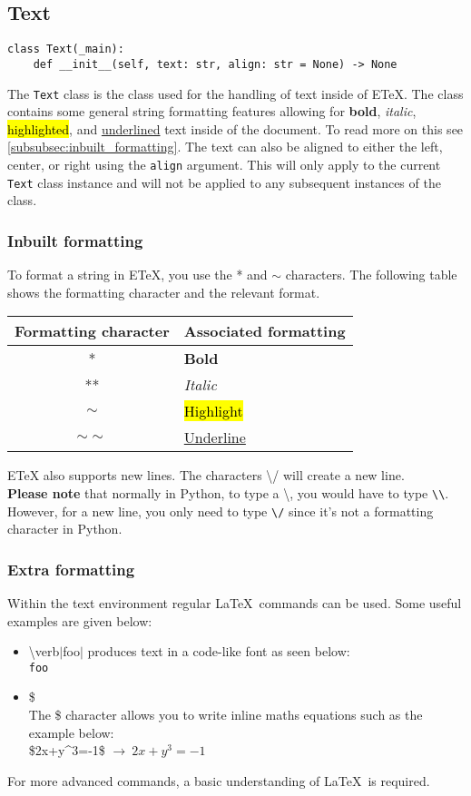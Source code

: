 \documentclass{article}
\begin{document}
\subsection{Text}\label{subsec:text}
\begin{verbatim}
class Text(_main):
	def __init__(self, text: str, align: str = None) -> None
\end{verbatim}
The \verb|Text| class is the class used for the handling of text inside of ETeX. The class contains some general string formatting features allowing for \textbf{bold}, \textit{italic}, \hl{highlighted}, and \underline{underlined} text inside of the document. To read more on this see \autoref{subsubsec:inbuilt_formatting}. The text can also be aligned to either the left, center, or right using the \verb|align| argument. This will only apply to the current \verb|Text| class instance and will not be applied to any subsequent instances of the class.
\subsubsection{Inbuilt formatting}\label{subsubsec:inbuilt_formatting}
To format a string in ETeX, you use the * and $\sim$ characters. The following table shows the formatting character and the relevant format.\\

\begin{center}
\begin{tabular}{| c | l |}
\hline
Formatting character & Associated formatting \\ \hline
* & \textbf{Bold} \\
** & \textit{Italic} \\
$\sim$ & \hl{Highlight} \\
$\sim\sim$ & \underline{Underline} \\
\hline
\end{tabular}
\end{center}
ETeX also supports new lines. The characters \textbackslash/ will create a new line.\\
 \textbf{Please note} that normally in Python, to type a \textbackslash, you would have to type \verb|\\|. However, for a new line, you only need to type \verb|\|\verb|/| since it's not a formatting character in Python.
\subsubsection{Extra formatting}\label{subsubsec:extra_formatting}
Within the text environment regular \LaTeX\ commands can be used. Some useful examples are given below:\begin{itemize}
\item {\textbackslash}verb$\mid${foo}$\mid$ produces text in a code-like font as seen below:\\
\verb|foo|
\item \$\\The \$ character allows you to write inline maths equations such as the example below:\\
\$2x+y\^{}3=-1\$ $\rightarrow\ 2x+y^3=-1$
\end{itemize}
For more advanced commands, a basic understanding of \LaTeX\ is required.
\end{document}
